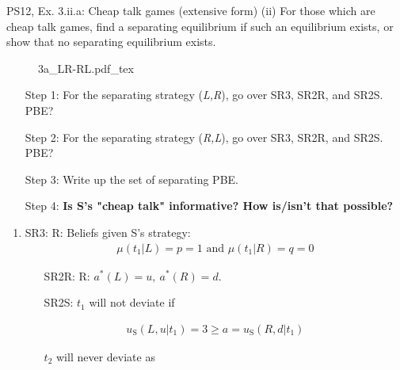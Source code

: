 \begin{frame}{PS12, Ex. 3.ii.a: Cheap talk games (extensive form)}
    (ii) For those which are cheap talk games, find a separating equilibrium if such an equilibrium exists, or show that no separating equilibrium exists.\vspace{-10pt}
    \begin{multicols}{2}
      \begin{figure}[!h]
        \center{}
        {3a_LR-RL.pdf_tex}
      \end{figure}\vspace{-6pt}
      \begin{itemize}
        \item[Step 1:] For the separating strategy (\textit{L,R}), go over SR3, SR2R, and SR2S. PBE?
        \item[Step 2:] For the separating strategy (\textit{R,L}), go over SR3, SR2R, and SR2S. PBE?
        \item[Step 3:] Write up the set of separating PBE.
        \item[Step 4:] \textbf{Is S's "cheap talk" informative? How is/isn't that possible?}
      \end{itemize}
      \vfill\null\columnbreak
      \begin{enumerate}
        \item SR3: R: Beliefs given S's strategy:\vspace{-8pt}
        \begin{align*}
          \mu(t_1|L)=p=1\text{ and }\mu(t_1|R)=q=0
        \end{align*}\vspace{-18pt}
        \begin{itemize}\normalsize
          \item[SR2R:] R: $a^*(L)=u,\ a^*(R)=d$.
          \item[SR2S:] $t_1$ will not deviate if
        \end{itemize}\vspace{-10pt}
        \begin{align*}
          u_\text{S}(L,u|t_1)=3\geq a=u_\text{S}(R,d|t_1)
        \end{align*}\vspace{-18pt}
        \begin{itemize}\normalsize
          \item[] $t_2$ will never deviate as
        \end{itemize}\vspace{-10pt}

\end{enumerate}
\end{multicols}
\end{frame}
